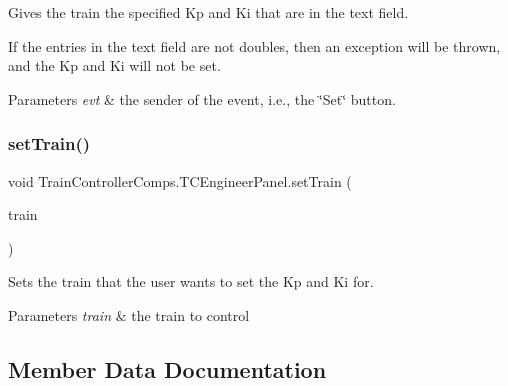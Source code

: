 Gives the train the specified Kp and Ki that are in the text field. 

If the entries in the text field are not doubles, then an exception will be thrown, and the Kp and Ki will not be set.


\begin{DoxyParams}{Parameters}
{\em evt} & the sender of the event, i.\+e., the \char`\"{}\+Set\char`\"{} button. \\
\hline
\end{DoxyParams}
\mbox{\label{classTrainControllerComps_1_1TCEngineerPanel_acf2325516cf881be1f635cc7bdbc4237}} 
\subsubsection{\texorpdfstring{set\+Train()}{setTrain()}}
{\footnotesize\ttfamily void Train\+Controller\+Comps.\+T\+C\+Engineer\+Panel.\+set\+Train (\begin{DoxyParamCaption}\item[{\hyperlink{classTrainControllerComps_1_1TestTrain}{Test\+Train}}]{train }\end{DoxyParamCaption})}



Sets the train that the user wants to set the Kp and Ki for. 


\begin{DoxyParams}{Parameters}
{\em train} & the train to control \\
\hline
\end{DoxyParams}


\subsection{Member Data Documentation}
\mbox{\label{classTrainControllerComps_1_1TCEngineerPanel_ae0b00ead9378147b868dd7dd31fc0ec9}} 
